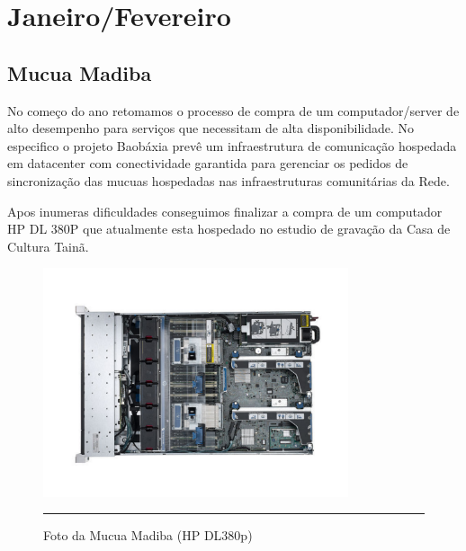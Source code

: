 \documentclass[a4paper, 11pt, oneside]{Relatorio_sem_2}  %
\begin{document}


\part{Janeiro/Fevereiro} %

\chapter{Mucua Madiba}

No começo do ano retomamos o processo de compra de um
computador/server de alto desempenho para serviços que necessitam de
alta disponibilidade. No especifico o projeto Baobáxia prevê um
infraestrutura de comunicação hospedada em datacenter com
conectividade garantida para gerenciar os pedidos de sincronização das
mucuas hospedadas nas infraestruturas comunitárias da Rede.

Apos inumeras dificuldades conseguimos finalizar a compra de um
computador HP DL 380P que atualmente esta hospedado no estudio de
gravação da Casa de Cultura Tainã.

\begin{figure}[htbp]
  \centering
  \includegraphics[width=0.8\textwidth]{./Fig/DL380P_1.pdf}
  \rule{35em}{0.5pt}
  \caption[Foto da Mucua Madiba (HP DL380p)]{Foto da Mucua Madiba (HP DL380p)}
  \label{fig:MucuaMadiba1}
\end{figure}
\end{document}
